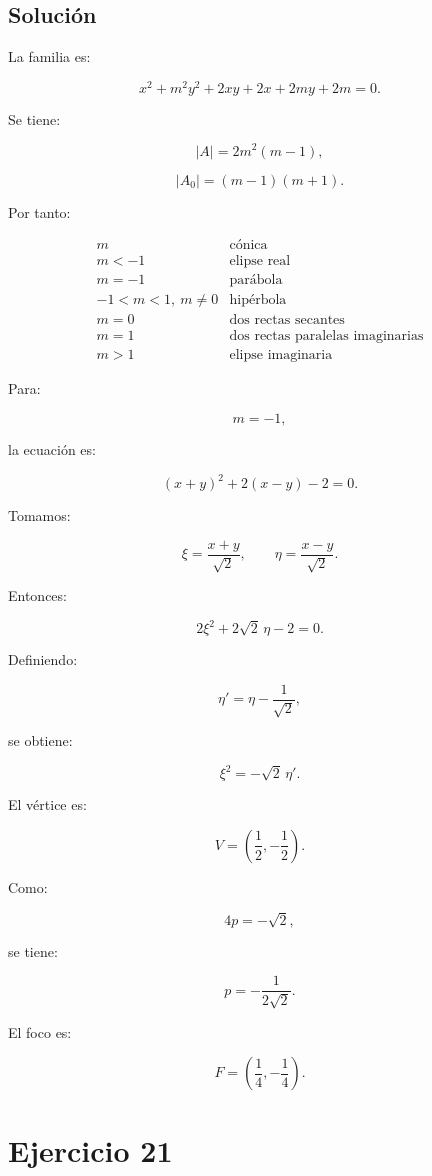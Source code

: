 \documentclass[11pt,a4paper]{article}
\begin{document}
\subsection{Solución}

La familia es:

\[
x^2+m^2y^2+2xy+2x+2my+2m=0.
\]

Se tiene:

\[
|A|
=
2m^2(m-1),
\]

\[
|A_0|
=
(m-1)(m+1).
\]

Por tanto:

\[
\boxed{
\begin{array}{c|c}
m & \text{cónica}\\
\hline
m<-1 & \text{elipse real}\\
m=-1 & \text{parábola}\\
-1<m<1,\ m\neq0 & \text{hipérbola}\\
m=0 & \text{dos rectas secantes}\\
m=1 & \text{dos rectas paralelas imaginarias}\\
m>1 & \text{elipse imaginaria}
\end{array}
}
\]

Para:

\[
m=-1,
\]

la ecuación es:

\[
(x+y)^2+2(x-y)-2=0.
\]

Tomamos:

\[
\xi=\frac{x+y}{\sqrt2},
\qquad
\eta=\frac{x-y}{\sqrt2}.
\]

Entonces:

\[
2\xi^2+2\sqrt2\,\eta-2=0.
\]

Definiendo:

\[
\eta'
=
\eta-\frac1{\sqrt2},
\]

se obtiene:

\[
\boxed{
\xi^2=-\sqrt2\,\eta'.
}
\]

El vértice es:

\[
V=
\left(
\frac12,-\frac12
\right).
\]

Como:

\[
4p=-\sqrt2,
\]

se tiene:

\[
p=-\frac1{2\sqrt2}.
\]

El foco es:

\[
\boxed{
F=
\left(
\frac14,-\frac14
\right).
}
\]

\section{Ejercicio 21}
\end{document}
